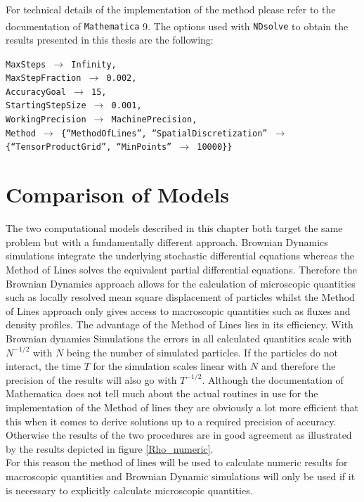 For technical details of the implementation of the method please refer to the documentation of {\tt Mathematica} 9\textsuperscript{\textregistered}. The options used with {\tt NDsolve} to obtain the results presented in this thesis are the following:\par
{\tt    MaxSteps $\rightarrow$ Infinity,  \\
        MaxStepFraction $\rightarrow$ 0.002, \\
        AccuracyGoal $\rightarrow$ 15,  \\
        StartingStepSize $\rightarrow$ 0.001, \\
        WorkingPrecision $\rightarrow$ MachinePrecision, \\
        Method $\rightarrow$ \{``MethodOfLines'', ``SpatialDiscretization'' $\rightarrow$ \{``TensorProductGrid'', ``MinPoints'' $\rightarrow$ 10000\}\}}

\section{Comparison of Models}
The two computational models described in this chapter both target the same problem but with a fundamentally different approach. Brownian Dynamics simulations integrate the underlying stochastic differential equations whereas the Method of Lines solves the equivalent partial differential equations. Therefore the Brownian Dynamics approach allows for the calculation of microscopic quantities such as locally resolved mean square displacement of particles whilst the Method of Lines approach only gives access to macroscopic quantities such as fluxes and density profiles. The advantage of the Method of Lines lies in its efficiency. With Brownian dynamics Simulations the errors in all calculated quantities scale with $N^{-1/2}$ with $N$ being the number of simulated particles. If the particles do not interact, the time $T$ for the simulation scales linear with $N$ and therefore the precision of the results will also go with $T^{-1/2}$. Although the documentation of Mathematica does not tell much about the actual routines in use for the implementation of the Method of lines they are obviously a lot more efficient that this when it comes to derive solutions up to a required precision of accuracy. Otherwise the results of the two procedures are in good agreement as illustrated by the results depicted in figure \ref{Rho_numeric}.\\
For this reason the method of lines will be used to calculate numeric results for macroscopic quantities and Brownian Dynamic simulations will only be used if it is necessary to explicitly calculate microscopic quantities.

